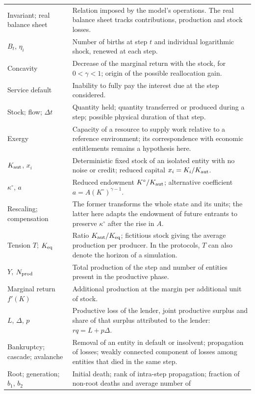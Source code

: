 \begin{small}
\begin{longtable}{@{}>{\raggedright\arraybackslash}p{.27\linewidth}p{.66\linewidth}@{}}
Invariant; real balance sheet & Relation imposed by the model's
operations. The real balance sheet tracks contributions, production
and stock losses. \\
$B_t$, $\eta_i$ & Number of births at step $t$ and individual
logarithmic shock, renewed at each step. \\
Concavity & Decrease of the marginal return with the stock, for
$0<\gamma<1$; origin of the possible reallocation gain. \\
Service default & Inability to fully pay the interest due at the
step considered. \\
Stock; flow; $\Delta t$ & Quantity held; quantity transferred or
produced during a step; possible physical duration of that step. \\
Exergy & Capacity of a resource to supply work relative to a
reference environment; its correspondence with economic entitlements
remains a hypothesis here. \\
$K_{\rm aut}$, $x_i$ & Deterministic fixed stock of an isolated
entity with no noise or credit; reduced capital $x_i=K_i/K_{\rm aut}$. \\
$\kappa^\circ$, $a$ & Reduced endowment $K^\circ/K_{\rm aut}$;
alternative coefficient $a=A(K^\circ)^{\gamma-1}$. \\
Rescaling; compensation & The former transforms the whole state and
its units; the latter here adapts the endowment of future entrants
to preserve $\kappa^\circ$ after the rise in $A$. \\
Tension $T$; $K_{\rm eq}$ & Ratio $K_{\rm aut}/K_{\rm eq}$; fictitious
stock giving the average production per producer. In the protocols,
$T$ can also denote the horizon of a simulation. \\
$Y$, $N_{\rm prod}$ & Total production of the step and number of
entities present in the productive phase. \\
Marginal return $f'(K)$ & Additional production at the margin per
additional unit of stock. \\
$L$, $\Delta$, $p$ & Productive loss of the lender, joint productive
surplus and share of that surplus attributed to the lender:
$rq=L+p\Delta$. \\
Bankruptcy; cascade; avalanche & Removal of an entity in default or
insolvent; propagation of losses; weakly connected component of
losses among entities that died in the same step. \\
Root; generation; $b_1$, $b_2$ & Initial death; rank of intra-step
propagation; fraction of non-root deaths and average number of

\end{longtable}
\end{small}

